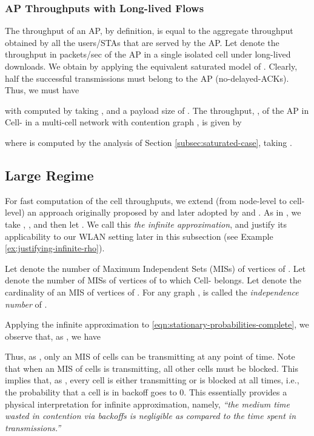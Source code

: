 \documentclass[10pt,a4paper,journal]{IEEEtran}
\theoremstyle{definition}
\theoremstyle{remark}
\theoremstyle{plain}
\begin{document}
\subsubsection{AP Throughputs with Long-lived Flows}
\label{subsubsec:computing-cell-throughputs-TCP-Long}

The throughput of an AP, by definition, is equal to the aggregate throughput obtained by all the users/STAs that are served by the AP. Let  denote the throughput in packets/sec of the AP in a single isolated cell under long-lived downloads. We obtain  by applying the equivalent saturated model of \cite{wanet.bruno08TCPeqvSatModel}. Clearly, half the successful transmissions must belong to the AP (no-delayed-ACKs). Thus, we must have 
 
with  computed by taking , and a payload size of . The throughput, , of the AP in Cell- in a multi-cell network with contention graph , is given by 

where  is computed by the analysis of Section \ref{subsec:saturated-case}, taking . 







\subsection{Large  Regime}
\label{subsec:large-rho-regime}

For fast computation of the cell throughputs, we extend (from node-level to cell-level) an approach originally proposed by \cite{wanet.wang-kar05multihop} and later adopted by \cite{wanet.durvy09selfOrganization} and \cite{wanet.liew_etal09ICCback-of-the-envelope}. As in \cite{wanet.wang-kar05multihop}, we take , , and then let . We call this \textit{the infinite  approximation}, and justify its applicability to our WLAN setting later in this subsection (see Example \ref{ex:justifying-infinite-rho}). 

Let  denote the number of Maximum Independent Sets (MISs) of vertices of . Let  denote the number of MISs of vertices of  to which Cell- belongs. Let  denote the cardinality of an MIS of vertices of . For any graph ,  is called the \textit{independence number} of . 

Applying the infinite  approximation to \eqref{eqn:stationary-probabilities-complete}, we observe that, as , we have 
 
Thus, as , only an MIS of cells can be transmitting at any point of time. Note that when an MIS of cells is transmitting, all other cells must be blocked. This implies that, as , every cell is either transmitting or is blocked at all times, i.e., the probability that a cell is in backoff goes to 0. This essentially provides a physical interpretation for infinite  approximation, namely, \textit{``the medium time wasted in contention via backoffs is negligible as compared to the time spent in transmissions.''} 
\end{document}
